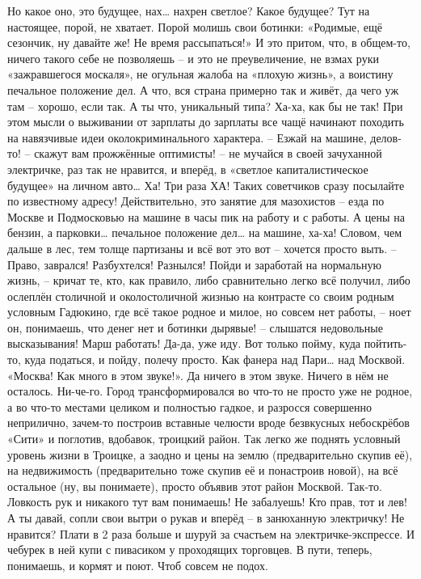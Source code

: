 Но какое оно, это будущее, нах… нахрен светлое? Какое будущее? Тут на настоящее, порой, не хватает. Порой молишь свои ботинки: «Родимые, ещё сезончик, ну давайте же! Не время рассыпаться!» И это притом, что, в общем-то, ничего такого себе не позволяешь – и это не преувеличение, не взмах руки «зажравшегося москаля», не огульная жалоба на «плохую жизнь», а воистину печальное положение дел. А что, вся страна примерно так и живёт, да чего уж там – хорошо, если так. А ты что, уникальный типа? Ха-ха, как бы не так! При этом мысли о выживании от зарплаты до зарплаты все чащё начинают походить на навязчивые идеи околокриминального характера.
– Езжай на машине, делов-то! – скажут вам прожжённые оптимисты! – не мучайся в своей зачуханной электричке, раз так не нравится, и вперёд, в «светлое капиталистическое будущее» на личном авто… Ха! Три раза ХА! Таких советчиков сразу посылайте по известному адресу! Действительно, это занятие для мазохистов – езда по Москве и Подмосковью на машине в часы пик на работу и с работы. А цены на бензин, а парковки… печальное положение дел… на машине, ха-ха! Словом, чем дальше в лес, тем толще партизаны и всё вот это вот – хочется просто выть.
– Право, заврался! Разбухтелся! Разнылся! Пойди и заработай на нормальную жизнь, – кричат те, кто, как правило, либо сравнительно легко всё получил, либо ослеплён столичной и околостоличной жизнью на контрасте со своим родным условным Гадюкино, где всё такое родное и милое, но совсем нет работы, – ноет он, понимаешь, что денег нет и ботинки дырявые! – слышатся недовольные высказывания! Марш работать! Да-да, уже иду. Вот только пойму, куда пойтить-то, куда податься, и пойду, полечу просто. Как фанера над Пари… над Москвой. 
«Москва! Как много в этом звуке!». Да ничего в этом звуке. Ничего в нём не осталось. Ни-че-го. Город трансформировался во что-то не просто уже не родное, а во что-то местами целиком и полностью гадкое, и разросся совершенно неприлично, зачем-то построив вставные челюсти вроде безвкусных небоскрёбов «Сити» и поглотив, вдобавок, троицкий район. Так легко же поднять условный уровень жизни в Троицке, а заодно и цены на землю (предварительно скупив её), на недвижимость (предварительно тоже скупив её и понастроив новой), на всё остальное (ну, вы понимаете), просто объявив этот район Москвой. Так-то. Ловкость рук и никакого тут вам понимаешь! Не забалуешь! Кто прав, тот и лев! А ты давай, сопли свои вытри о рукав и вперёд – в занюханную электричку! Не нравится? Плати в 2 раза больше и шуруй за счастьем на электричке-экспрессе. И чебурек в ней купи с пивасиком у проходящих торговцев. В пути, теперь, понимаешь, и кормят и поют. Чтоб совсем не подох.

